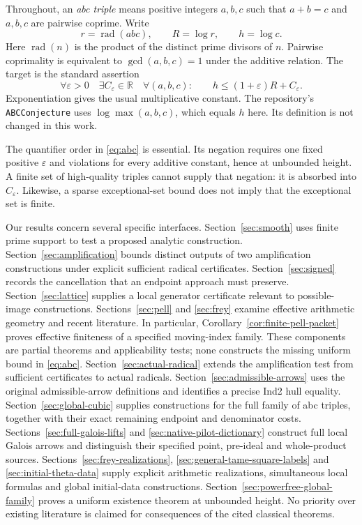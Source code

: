 \documentclass[11pt]{amsart}
\theoremstyle{definition}
\theoremstyle{remark}
\newcommand{\R}{\mathbb R}
\newcommand{\rad}{\operatorname{rad}}
\newcommand{\eps}{\varepsilon}
\begin{document}
Throughout, an \emph{abc triple} means positive integers $a,b,c$ such that
$a+b=c$ and $a,b,c$ are pairwise coprime. Write
\[
 r=\rad(abc),\qquad R=\log r,\qquad h=\log c.
\]
Here $\rad(n)$ is the product of the distinct prime divisors of $n$.
Pairwise coprimality is equivalent to $\gcd(a,b,c)=1$ under the additive
relation. The target is the standard assertion
\begin{equation}\label{eq:abc}
 \forall\eps>0\quad\exists C_\eps\in\R\quad
 \forall(a,b,c):\qquad h\le(1+\eps)R+C_\eps.
\end{equation}
Exponentiation gives the usual multiplicative constant. The repository's
\texttt{ABCConjecture} uses $\log\max(a,b,c)$, which equals $h$ here.
Its definition is not changed in this work.

The quantifier order in \eqref{eq:abc} is essential. Its negation requires
one fixed positive $\eps$ and violations for every additive constant, hence
at unbounded height. A finite set of high-quality triples cannot supply that
negation: it is absorbed into $C_\eps$. Likewise, a sparse exceptional-set
bound does not imply that the exceptional set is finite.

Our results concern several specific interfaces. Section~\ref{sec:smooth}
uses finite prime support to test a proposed analytic construction.
Section~\ref{sec:amplification} bounds distinct outputs of two amplification
constructions under explicit sufficient radical certificates.
Section~\ref{sec:signed} records the cancellation that an endpoint approach
must preserve. Section~\ref{sec:lattice} supplies a local generator
certificate relevant to possible-image constructions. Sections~\ref{sec:pell}
and \ref{sec:frey} examine effective arithmetic geometry and recent
literature. In particular, Corollary~\ref{cor:finite-pell-packet} proves
effective finiteness of a specified moving-index family. These components
are partial theorems and applicability tests; none
constructs the missing uniform bound in \eqref{eq:abc}.
Section~\ref{sec:actual-radical} extends the amplification test from
sufficient certificates to actual radicals. Section~\ref{sec:admissible-arrows}
uses the original admissible-arrow definitions and identifies a precise
Ind2 hull equality. Section~\ref{sec:global-cubic} supplies constructions
for the full family of abc triples, together with their exact remaining
endpoint and denominator costs.
Sections~\ref{sec:full-galois-lifts} and \ref{sec:native-pilot-dictionary}
construct full local Galois arrows and distinguish their specified
point, pre-ideal and whole-product sources.
Sections~\ref{sec:frey-realizations}, \ref{sec:general-tame-square-labels}
and \ref{sec:initial-theta-data} supply explicit arithmetic realizations,
simultaneous local formulas and global initial-data constructions.
Section~\ref{sec:powerfree-global-family} proves a uniform existence
theorem at unbounded height. No priority over existing literature is
claimed for consequences of the cited classical theorems.
\end{document}
